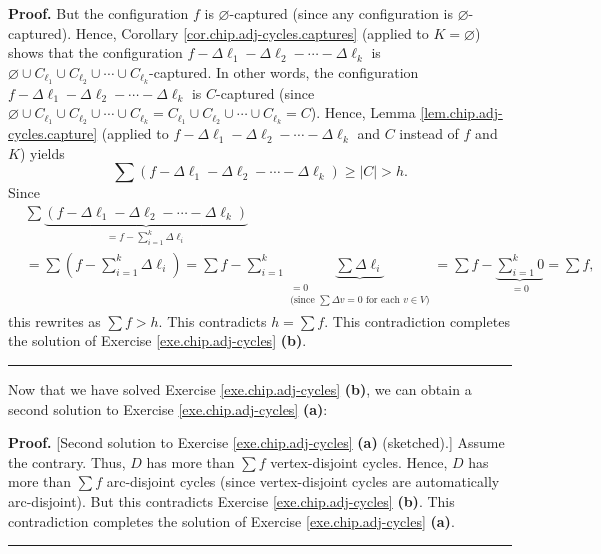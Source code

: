 \documentclass[numbers=enddot,12pt,final,onecolumn,notitlepage]{scrartcl}%
\theoremstyle{definition}
\newenvironment{proof}[1][Proof]{\noindent\textbf{#1.} }{\ \rule{0.5em}{0.5em}}
\let\sumnonlimits\sum
\renewcommand{\sum}{\sumnonlimits\limits}
\begin{document}
\begin{proof}
But the configuration $f$ is $\varnothing$-captured (since any configuration
is $\varnothing$-captured). Hence, Corollary
\ref{cor.chip.adj-cycles.captures} (applied to $K=\varnothing$) shows that the
configuration $f-\Delta\ell_{1}-\Delta\ell_{2}-\cdots-\Delta\ell_{k}$ is
$\varnothing\cup C_{\ell_{1}}\cup C_{\ell_{2}}\cup\cdots\cup C_{\ell_{k}}%
$-captured. In other words, the configuration $f-\Delta\ell_{1}-\Delta\ell
_{2}-\cdots-\Delta\ell_{k}$ is $C$-captured (since $\varnothing\cup
C_{\ell_{1}}\cup C_{\ell_{2}}\cup\cdots\cup C_{\ell_{k}}=C_{\ell_{1}}\cup
C_{\ell_{2}}\cup\cdots\cup C_{\ell_{k}}=C$). Hence, Lemma
\ref{lem.chip.adj-cycles.capture} (applied to $f-\Delta\ell_{1}-\Delta\ell
_{2}-\cdots-\Delta\ell_{k}$ and $C$ instead of $f$ and $K$) yields%
\[
\sum\left(  f-\Delta\ell_{1}-\Delta\ell_{2}-\cdots-\Delta\ell_{k}\right)
\geq\left\vert C\right\vert >h.
\]
Since%
\begin{align*}
& \sum\underbrace{\left(  f-\Delta\ell_{1}-\Delta\ell_{2}-\cdots-\Delta
\ell_{k}\right)  }_{=f-\sum_{i=1}^{k}\Delta\ell_{i}}\\
& =\sum\left(  f-\sum_{i=1}^{k}\Delta\ell_{i}\right)  =\sum f-\sum_{i=1}%
^{k}\underbrace{\sum\Delta\ell_{i}}_{\substack{=0\\\text{(since }\sum\Delta
v=0\text{ for each }v\in V\text{)}}}=\sum f-\underbrace{\sum_{i=1}^{k}0}%
_{=0}=\sum f,
\end{align*}
this rewrites as $\sum f>h$. This contradicts $h=\sum f$. This contradiction
completes the solution of Exercise \ref{exe.chip.adj-cycles} \textbf{(b)}.
\end{proof}

Now that we have solved Exercise \ref{exe.chip.adj-cycles} \textbf{(b)}, we
can obtain a second solution to Exercise \ref{exe.chip.adj-cycles}
\textbf{(a)}:

\begin{proof}
[Second solution to Exercise \ref{exe.chip.adj-cycles} \textbf{(a)} (sketched).]
Assume the contrary. Thus, $D$ has more than $\sum f$ vertex-disjoint cycles.
Hence, $D$ has more than $\sum f$ arc-disjoint cycles (since vertex-disjoint
cycles are automatically arc-disjoint). But this contradicts Exercise
\ref{exe.chip.adj-cycles} \textbf{(b)}.  This contradiction completes the
solution of Exercise \ref{exe.chip.adj-cycles} \textbf{(a)}.
\end{proof}
\end{document}
